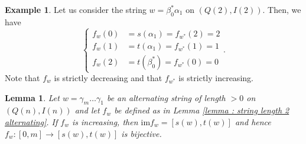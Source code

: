 \documentclass[11pt]{amsart}
\newtheorem{lemma}[theorem]{Lemma}
\theoremstyle{definition}
\newtheorem{example}[theorem]{Example}
\newcommand{\im}{\mathrm{im}}
\begin{document}
\begin{example}
    Let us consider the string $w=\beta_0^*\alpha_1$ on $(Q(2),I(2))$. Then, we have \[
    \begin{cases}
        f_w(0)&=s(\alpha_1)= f_{w^*}(2)=2 \\ f_w(1)&=t(\alpha_1)=f_{w^*}(1) =1 \\ f_w(2)&=t(\beta_0^*)=f_{w^*}(0)=0
    \end{cases}.
    \]
    Note that $f_w$ is strictly decreasing and that $f_{w^*}$ is strictly increasing.
\end{example}

\begin{lemma}\label{lemma : fw bijection on image}
    Let $w=\gamma_m\ldots\gamma_1$ be an alternating string of length $>0$ on $(Q(n), I(n))$ and let $f_w$ be defined as in Lemma \ref{lemma : string length 2 alternating}. If $f_w$ is increasing, then $\im f_w=[s(w), t(w)]$ and hence $f_w:[0,m]\to [s(w), t(w)]$ is bijective.
\end{lemma}
\end{document}

